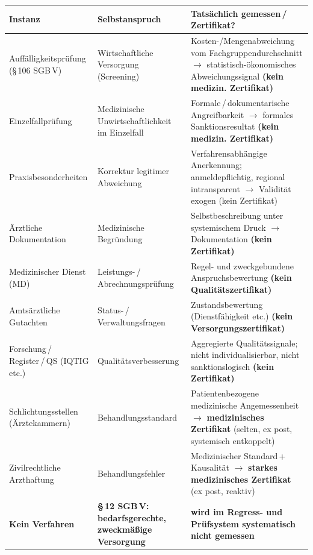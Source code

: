 \documentclass{umbruch-position}
\begin{document}
{\small
\begin{tabularx}{\textwidth}{p{4cm} X X}
\toprule
\textbf{Instanz} & \textbf{Selbstanspruch} & \textbf{Tatsächlich gemessen\,/\,Zertifikat?} \\
\midrule
Auffälligkeits\-prüfung (\S\,106 SGB\,V) & Wirtschaftliche Versorgung (Screening) & Kosten-/Mengenabweichung vom Fachgruppen\-durch\-schnitt $\to$ statistisch-ökonomisches Abweichungssignal \textbf{(kein medizin. Zertifikat)} \\
\addlinespace
Einzelfall\-prüfung & Medizinische Unwirt\-schaft\-lich\-keit im Einzelfall & Formale\,/\,doku\-mentarische Angreifbarkeit $\to$ formales Sanktionsresultat \textbf{(kein medizin. Zertifikat)} \\
\addlinespace
Praxis\-besonderheiten & Korrektur legitimer Abweichung & Verfahrensabhängige Anerkennung; anmeldepflichtig, regional intransparent $\to$ Validität exogen (kein Zertifikat) \\
\addlinespace
Ärztliche Dokumentation & Medizinische Begründung & Selbstbeschreibung unter systemischem Druck $\to$ Dokumentation \textbf{(kein Zertifikat)} \\
\addlinespace
Medizinischer Dienst (MD) & Leistungs-\,/\,Abrechnungs\-prüfung & Regel- und zweckgebundene Anspruchsbewertung \textbf{(kein Qualitätszertifikat)} \\
\addlinespace
Amtsärztliche Gutachten & Status-\,/\,Verwaltungs\-fragen & Zustandsbewertung (Dienstfähigkeit etc.) \textbf{(kein Versorgungs\-zertifikat)} \\
\addlinespace
Forschung\,/\,Register\,/\,QS (IQTIG etc.) & Qualitäts\-verbesserung & Aggregierte Qualitätssignale; nicht individualisierbar, nicht sanktionslogisch \textbf{(kein Zertifikat)} \\
\addlinespace
Schlichtungsstellen (Ärztekammern) & Behandlungsstandard & Patientenbezogene medizinische Angemessenheit $\to$ \textbf{medizinisches Zertifikat} (selten, ex post, systemisch entkoppelt) \\
\addlinespace
Zivilrechtliche Arzthaftung & Behandlungsfehler & Medizinischer Standard\,+\,Kausalität $\to$ \textbf{starkes medizinisches Zertifikat} (ex post, reaktiv) \\
\midrule
\textbf{Kein Verfahren} & \textbf{\S\,12 SGB\,V: bedarfsgerechte, zweckmäßige Versorgung} & \textbf{wird im Regress- und Prüfsystem systematisch nicht gemessen} \\
\bottomrule
\end{tabularx}
}
\end{document}
